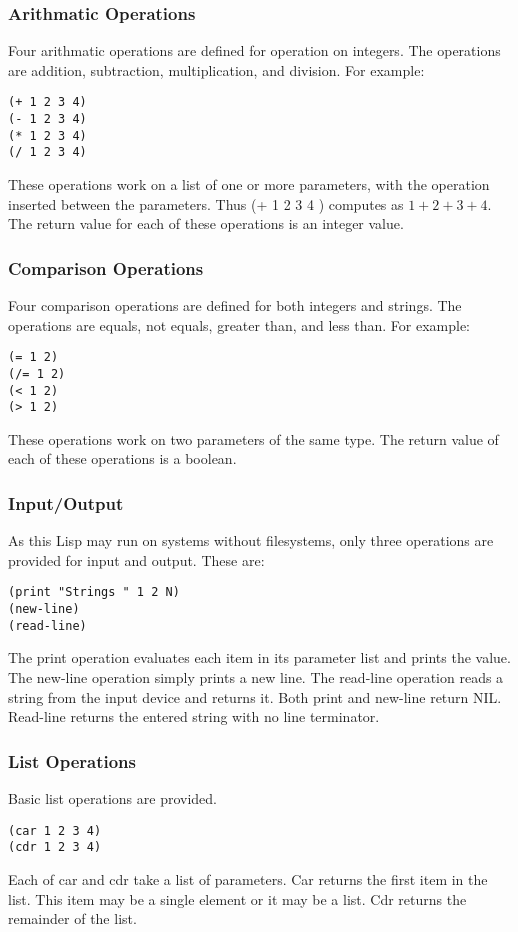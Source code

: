 \documentclass[10pt, openany]{book}
\begin{document}
\subsubsection{Arithmatic Operations}
Four arithmatic operations are defined for operation on integers.  The operations are addition, subtraction, multiplication, and division.  For example:
\begin{lstlisting}
(+ 1 2 3 4)
(- 1 2 3 4)
(* 1 2 3 4)
(/ 1 2 3 4)
\end{lstlisting}
These operations work on a list of one or more parameters, with the operation inserted between the parameters.  Thus (+ 1 2 3 4 ) computes as $1+2+3+4$.  The return value for each of these operations is an integer value.

\subsubsection{Comparison Operations}
Four comparison operations are defined for both integers and strings.  The operations are equals, not equals, greater than, and less than.  For example:
\begin{lstlisting}
(= 1 2)
(/= 1 2)
(< 1 2)
(> 1 2)
\end{lstlisting}
These operations work on two parameters of the same type.  The return value of each of these operations is a boolean.

\subsubsection{Input/Output}
As this Lisp may run on systems without filesystems, only three operations are provided for input and output.  These are:
\begin{lstlisting}
(print "Strings " 1 2 N)
(new-line)
(read-line)
\end{lstlisting}
The print operation evaluates each item in its parameter list and prints the value.  The new-line operation simply prints a new line.  The read-line operation reads a string from the input device and returns it.  Both print and new-line return NIL.  Read-line returns the entered string with no line terminator.

\subsubsection{List Operations}
Basic list operations are provided.
\begin{lstlisting}
(car 1 2 3 4)
(cdr 1 2 3 4)
\end{lstlisting}
Each of car and cdr take a list of parameters.  Car returns the first item in the list.  This item may be a single element or it may be a list.  Cdr returns the remainder of the list.
\end{document}
